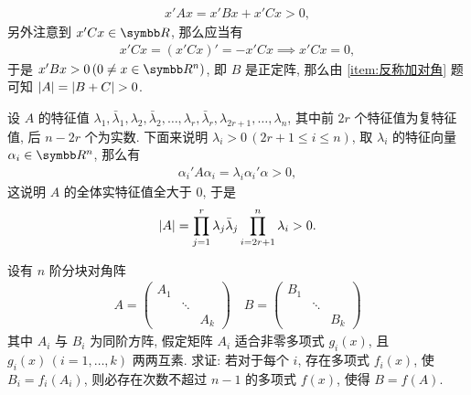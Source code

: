 \documentclass{ctexart}
\begin{document}
\begin{exercise}[series=exer]
\begin{answer}
\begin{method}
            \begin{align*}
                x'Ax = x'Bx + x'Cx > 0,
            \end{align*}
            另外注意到 $ x'Cx\in \R $, 那么应当有
            \begin{align*}
                x'Cx = (x'Cx)' = -x'Cx \implies x'Cx = 0,
            \end{align*}
            于是 $ x'Bx > 0\,(0 \ne x \in \R^{n}) $, 即 $ B $ 是正定阵, 那么由 \ref{item:反称加对角} 题可知 $ \abs{A} = \abs{B + C} > 0 $.
            \item 设 $ A $ 的特征值 $ \lambda_{1}, \bar{\lambda}_{1}, \lambda_{2}, \bar{\lambda}_{2}, \dots, \lambda_{r}, \bar{\lambda}_{r}, \lambda_{2r + 1}, \dots, \lambda_{n} $, 其中前 $ 2r $ 个特征值为复特征值, 后 $ n - 2r $ 个为实数. 下面来说明 $ \lambda_{i} > 0\,(2r + 1 \le i \le n) $, 取 $ \lambda_{i} $ 的特征向量 $ \alpha_{i} \in \R^{n} $, 那么有
            \begin{align*}
                \alpha_{i}'A\alpha_{i} = \lambda_{i}\alpha_{i}'\alpha > 0,
            \end{align*}
            这说明 $ A $ 的全体实特征值全大于 $ 0 $, 于是
            \begin{align*}
                \abs{A} = \prod_{j = 1}^{r}\lambda_{j}\bar{\lambda}_{j}\prod_{i = 2r + 1}^{n} \lambda_{i} > 0.
            \end{align*}
        \end{method}
    \end{answer}
    \item 设有 $ n $ 阶分块对角阵 
    \begin{align*}
        A = \begin{pmatrix}
            A_{1} & & \\
            & \ddots & \\
            & & A_{k}
        \end{pmatrix}\quad 
        B = \begin{pmatrix}
            B_{1} & & \\
            & \ddots & \\
            & & B_{k}
        \end{pmatrix}
    \end{align*}
    其中 $ A_{i} $ 与 $ B_{i} $ 为同阶方阵, 假定矩阵 $ A_{i} $ 适合非零多项式 $ g_{i}(x) $, 且 $ g_{i}(x)\,(i = 1, \dots, k) $ 两两互素. 求证: 若对于每个 $ i $, 存在多项式 $ f_{i}(x) $, 使 $ B_{i} = f_{i}(A_{i}) $, 则必存在次数不超过 $ n-1 $ 的多项式 $ f(x) $, 使得 $ B = f(A) $.

\end{exercise}
\end{document}

